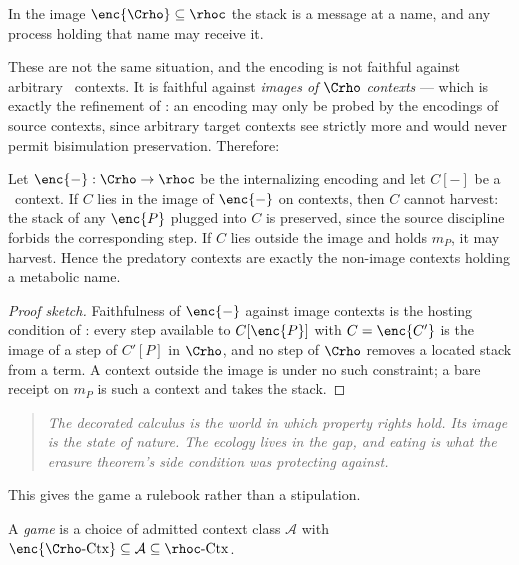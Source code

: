 In the image $\enc{\Crho} \subseteq \rhoc$ the stack is a message at a name, and any process holding
that name may receive it.

These are not the same situation, and the encoding is not faithful against arbitrary \rhoc\ contexts.
It is faithful against \emph{images of $\Crho$ contexts} --- which is exactly the refinement of
\cite{Probing}: an encoding may only be probed by the encodings of source contexts, since arbitrary
target contexts see strictly more and would never permit bisimulation preservation. Therefore:

\begin{theorem}
\label{sci:thm:predator}
Let $\enc{-} : \Crho \to \rhoc$ be the internalizing encoding and let $C[-]$ be a \rhoc\ context. If
$C$ lies in the image of $\enc{-}$ on contexts, then $C$ cannot harvest: the stack of any
$\enc{P}$ plugged into $C$ is preserved, since the source discipline forbids the corresponding step.
If $C$ lies outside the image and holds $m_P$, it may harvest. Hence the predatory contexts are
exactly the non-image contexts holding a metabolic name.
\end{theorem}

\begin{proof}[Proof sketch]
Faithfulness of $\enc{-}$ against image contexts is the hosting condition of \cite{Probing}: every
step available to $C[\enc{P}]$ with $C = \enc{C'}$ is the image of a step of $C'[P]$ in $\Crho$, and
no step of $\Crho$ removes a located stack from a term. A context outside the image is under no such
constraint; a bare receipt on $m_P$ is such a context and takes the stack.
\end{proof}

\begin{quote}
\itshape The decorated calculus is the world in which property rights hold. Its image is the state of
nature. The ecology lives in the gap, and eating is what the erasure theorem's side condition was
protecting against.
\end{quote}

This gives the game a rulebook rather than a stipulation.

\begin{definition}
\label{sci:def:game}
A \emph{game} is a choice of admitted context class $\mathcal{A}$ with
$\enc{\Crho\text{-}\mathrm{Ctx}} \subseteq \mathcal{A} \subseteq \rhoc\text{-}\mathrm{Ctx}$.
\end{definition}

